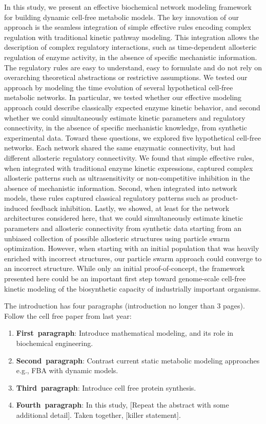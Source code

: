 \documentclass[12pt]{article}
\begin{document}
In this study, we present an effective biochemical network modeling framework for building dynamic cell-free metabolic models.
The key innovation of our approach is the seamless integration of simple effective rules encoding complex regulation with traditional kinetic pathway modeling.
This integration allows the description of complex regulatory interactions, such as time-dependent allosteric regulation of enzyme activity, in the absence of specific mechanistic information.
The regulatory rules are easy to understand, easy to formulate and do not rely on overarching theoretical abstractions or restrictive assumptions.
We tested our approach by modeling the time evolution of several hypothetical cell-free metabolic networks.
In particular, we tested whether our effective modeling approach could describe classically expected enzyme kinetic behavior, and second whether we could simultaneously estimate kinetic parameters and regulatory connectivity, in the absence of specific mechanistic knowledge, from synthetic experimental data.
Toward these questions, we explored five hypothetical cell-free networks.
Each network shared the same enzymatic connectivity, but had different allosteric regulatory connectivity.
We found that simple effective rules, when integrated with traditional enzyme kinetic expressions, captured complex allosteric patterns such as ultrasensitivity or non-competitive inhibition in the absence of mechanistic information. Second, when integrated into network models, these rules captured classical regulatory patterns such as product-induced feedback inhibition.
Lastly, we showed, at least for the network architectures considered here, that we could simultaneously estimate kinetic parameters and allosteric connectivity from synthetic data
starting from an unbiased collection of possible allosteric structures using particle swarm optimization. However, when starting with an initial population that was heavily enriched with incorrect structures, our particle swarm approach could converge to an incorrect structure.
While only an initial proof-of-concept, the framework presented here could be an important first step toward genome-scale cell-free kinetic modeling of the biosynthetic capacity of industrially important organisms.


The introduction has four paragraphs (introduction no longer than 3 pages). Follow the cell free paper from last year:
\begin{enumerate}
	\item{\textbf{First~paragraph}: Introduce mathematical modeling, and its role in biochemical engineering. }
	\item{\textbf{Second~paragraph}: Contrast current static metabolic modeling approaches e.g., FBA with dynamic models.}
	\item{\textbf{Third~paragraph}: Introduce cell free protein synthesis.}
	\item{\textbf{Fourth~paragraph}: In this study, [Repeat the abstract with some additional detail]. Taken together, [killer statement].}
\end{enumerate}
\end{document}
